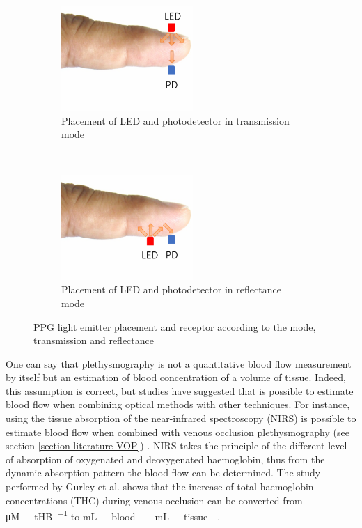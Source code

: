 \begin{figure}[!htbp]
	\centering
	\begin{subfigure}[t]{0.45\textwidth}
		\centering
		\includegraphics[height=4cm]{figure7a}
		\caption{Placement of LED and photodetector in transmission mode}
		\label{fig:PPG transmission}
	\end{subfigure}%
	~ 
	\begin{subfigure}[t]{0.45\textwidth}
		\centering
		\includegraphics[height=4cm]{figure7b}
		\caption{Placement of LED and photodetector in reflectance mode}
		\label{fig:PPG reflectance}
	\end{subfigure}
	\caption[PPG sensors placemens as transmission and reflectance modes]{PPG light emitter placement and receptor according to the mode, transmission and reflectance}
	\label{fig:PPG modes}
\end{figure}

One can say that plethysmography is not a quantitative blood flow measurement by itself but an estimation of blood concentration of a volume of tissue. Indeed, this assumption is correct, but studies have suggested that is possible to estimate blood flow when combining optical methods with other techniques. For instance, using the tissue absorption of the near-infrared spectroscopy (NIRS) is possible to estimate blood flow when combined with venous occlusion plethysmography (see section \ref{section literature VOP}) \cite{van2001performance, harel2008near, de1993noninvasive, gurley2012noninvasive}. NIRS takes the principle of the different level of absorption of oxygenated and deoxygenated haemoglobin, thus from the dynamic absorption pattern the blood flow can be determined. The study performed by Gurley et al. shows that the increase of total haemoglobin concentrations (THC) during venous occlusion can be converted from \si{\micro M  \ tHB\per\sec} to \si{\mL \ blood  \ \mL \ tissue \per\min}.

